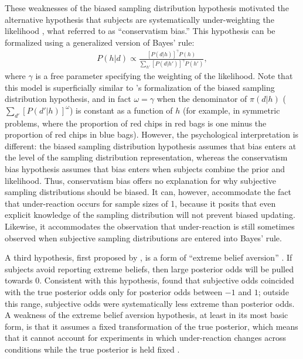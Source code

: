 These weaknesses of the biased sampling distribution hypothesis motivated the alternative hypothesis that subjects are systematically under-weighting the likelihood \citep{phillips1966conservatism}, what \citet{edwards1968conservatism} referred to as ``conservatism bias.'' This hypothesis can be formalized using a generalized version of Bayes' rule:
\begin{align}
    P(h|d) \propto \frac{[P(d|h)]^\gamma P(h)}{\sum_{h'} [P(d|h')]^\gamma P(h')},
    \label{eq:bias}
\end{align}
where $\gamma$ is a free parameter specifying the weighting of the likelihood. Note that this model is superficially similar to \citet{edwards1968conservatism}'s formalization of the biased sampling distribution hypothesis, and in fact $\omega = \gamma$ when the denominator of $\pi(d|h)$ ($\sum_{d'} [P(d'|h)]^\omega$) is constant as a function of $h$ (for example, in symmetric problems, where the proportion of red chips in red bags is one minus the proportion of red chips in blue bags). However, the psychological interpretation is different: the biased sampling distribution hypothesis assumes that bias enters at the level of the sampling distribution representation, whereas the conservatism bias hypothesis assumes that bias enters when subjects combine the prior and likelihood. Thus, conservatism bias offers no explanation for why subjective sampling distributions should be biased. It can, however, accommodate the fact that under-reaction occurs for sample sizes of 1, because it posits that even explicit knowledge of the sampling distribution will not prevent biased updating. Likewise, it accommodates the observation that under-reaction is still sometimes observed when subjective sampling distributions are entered into Bayes' rule.

A third hypothesis, first proposed by \citet{ducharme1970response}, is a form of ``extreme belief aversion'' \citep[see also][]{benjamin18}. If subjects avoid reporting extreme beliefs, then large posterior odds will be pulled towards 0. Consistent with this hypothesis, \citet{ducharme1970response} found that subjective odds coincided with the true posterior odds only for posterior odds between $-1$ and $1$; outside this range, subjective odds were systematically less extreme than posterior odds. A weakness of the extreme belief aversion hypothesis, at least in its most basic form, is that it assumes a fixed transformation of the true posterior, which means that it cannot account for experiments in which under-reaction changes across conditions while the true posterior is held fixed \citep[e.g.,][]{griffin1992weighing,kraemer2004people,benjamin2016model}.

